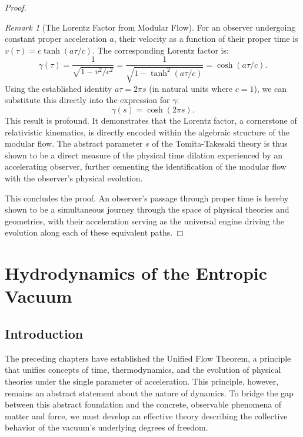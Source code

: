\documentclass[11pt, letterpaper]{report}
\theoremstyle{plain} %
\theoremstyle{definition} %
\theoremstyle{remark} %
\newtheorem{remark}{Remark}[chapter]
\begin{document}
\begin{proof}
\begin{remark}[The Lorentz Factor from Modular Flow]
For an observer undergoing constant proper acceleration $a$, their velocity as a function of their proper time is $v(\tau) = c \tanh(a\tau/c)$. The corresponding Lorentz factor is:
\begin{equation}
    \gamma(\tau) = \frac{1}{\sqrt{1-v^2/c^2}} = \frac{1}{\sqrt{1-\tanh^2(a\tau/c)}} = \cosh(a\tau/c).
\end{equation}
Using the established identity $a\tau = 2\pi s$ (in natural units where $c=1$), we can substitute this directly into the expression for $\gamma$:
\begin{equation}
    \gamma(s) = \cosh(2\pi s).
\end{equation}
This result is profound. It demonstrates that the Lorentz factor, a cornerstone of relativistic kinematics, is directly encoded within the algebraic structure of the modular flow. The abstract parameter $s$ of the Tomita-Takesaki theory is thus shown to be a direct measure of the physical time dilation experienced by an accelerating observer, further cementing the identification of the modular flow with the observer's physical evolution.
\end{remark}
This concludes the proof. An observer's passage through proper time is hereby shown to be a simultaneous journey through the space of physical theories and geometries, with their acceleration serving as the universal engine driving the evolution along each of these equivalent paths.
\end{proof}




\chapter{Hydrodynamics of the Entropic Vacuum}
\label{chap:hydrodynamics}

\section{Introduction}

The preceding chapters have established the Unified Flow Theorem, a principle that unifies concepts of time, thermodynamics, and the evolution of physical theories under the single parameter of acceleration. This principle, however, remains an abstract statement about the nature of dynamics. To bridge the gap between this abstract foundation and the concrete, observable phenomena of matter and force, we must develop an effective theory describing the collective behavior of the vacuum's underlying degrees of freedom.
\end{document}
